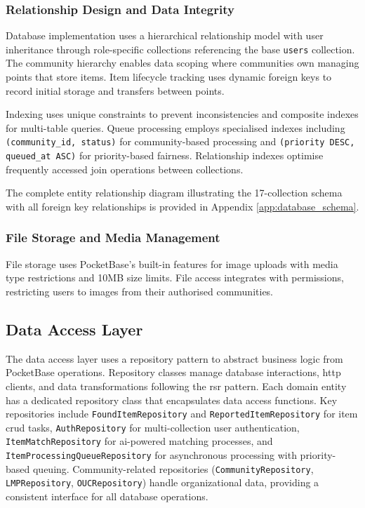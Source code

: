 \subsubsection{Relationship Design and Data Integrity}

Database implementation uses a hierarchical relationship model with user inheritance through role-specific collections referencing the base \texttt{users} collection. The community hierarchy enables data scoping where communities own managing points that store items. Item lifecycle tracking uses dynamic foreign keys to record initial storage and transfers between points.

Indexing uses unique constraints to prevent inconsistencies and composite indexes for multi-table queries. Queue processing employs specialised indexes including \texttt{(community\_id, status)} for community-based processing and \texttt{(priority DESC, queued\_at ASC)} for priority-based fairness. Relationship indexes optimise frequently accessed join operations between collections.

The complete entity relationship diagram illustrating the 17-collection schema with all foreign key relationships is provided in Appendix \ref{app:database_schema}.

\subsubsection{File Storage and Media Management}

File storage uses PocketBase's built-in features for image uploads with media type restrictions and 10MB size limits. File access integrates with permissions, restricting users to images from their authorised communities.

\subsection{Data Access Layer} \label{subsection:data_access_layer}

The data access layer uses a repository pattern to abstract business logic from PocketBase operations. Repository classes manage database interactions, \ac{http} clients, and data transformations following the \ac{rsr} pattern. Each domain entity has a dedicated repository class that encapsulates data access functions. Key repositories include \texttt{FoundItemRepository} and \texttt{ReportedItemRepository} for item \ac{crud} tasks, \texttt{AuthRepository} for multi-collection user authentication, \texttt{ItemMatchRepository} for \ac{ai}-powered matching processes, and \texttt{ItemProcessingQueueRepository} for asynchronous processing with priority-based queuing. Community-related repositories (\texttt{CommunityRepository}, \texttt{LMPRepository}, \texttt{OUCRepository}) handle organizational data, providing a consistent interface for all database operations.

